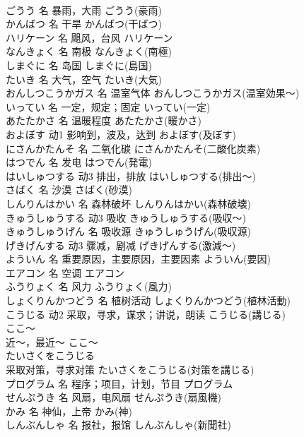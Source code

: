 \documentclass[8pt]{extreport}
\begin{document}
\begin{CJK}{UTF8}{min}
\\	ごうう	名	暴雨，大雨	ごうう(豪雨)	
\\	かんばつ	名	干旱	かんばつ(干ばつ)	
\\	ハリケーン	名	飓风，台风	ハリケーン	
\\	なんきょく	名	南极	なんきょく(南極)	
\\	しまぐに	名	岛国	しまぐに(島国)	
\\	たいき	名	大气，空气	たいき(大気)	
\\	おんしつこうかガス	名	温室气体	おんしつこうかガス(温室効果～)	
\\	いってい	名	一定，规定；固定	いってい(一定)	
\\	あたたかさ	名	温暖程度	あたたかさ(暖かさ)	
\\	およぼす	动1	影响到，波及，达到	およぼす(及ぼす)	
\\	にさんかたんそ	名	二氧化碳	にさんかたんそ(二酸化炭素)	
\\	はつでん	名	发电	はつでん(発電)	
\\	はいしゅつする	动3	排出，排放	はいしゅつする(排出～)	
\\	さばく	名	沙漠	さばく(砂漠)	
\\	しんりんはかい	名	森林破坏	しんりんはかい(森林破壊)	
\\	きゅうしゅうする	动3	吸收	きゅうしゅうする(吸収～)	
\\	きゅうしゅうげん	名	吸收源	きゅうしゅうげん(吸収源)	
\\	げきげんする	动3	骤减，剧减	げきげんする(激減～)	
\\	よういん	名	重要原因，主要原因，主要因素	よういん(要因)	
\\	エアコン	名	空调	エアコン	
\\	ふうりょく	名	风力	ふうりょく(風力)	
\\	しょくりんかつどう	名	植树活动	しょくりんかつどう(植林活動)	
\\	こうじる	动2	采取，寻求，谋求；讲说，朗读	こうじる(講じる)	
\\	ここ～	
\\	近～，最近～	ここ～	
\\	たいさくをこうじる	
\\	采取对策，寻求对策	たいさくをこうじる(対策を講じる)	
\\	プログラム	名	程序；项目，计划，节目	プログラム	
\\	せんぷうき	名	风扇，电风扇	せんぷうき(扇風機)	
\\	かみ	名	神仙，上帝	かみ(神)	
\\	しんぶんしゃ	名	报社，报馆	しんぶんしゃ(新聞社)	

\end{CJK}
\end{document}
